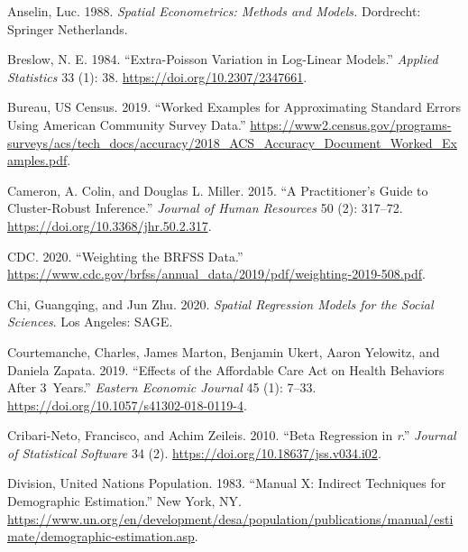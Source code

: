 \documentclass[
  letterpaper,
  DIV=11,
  numbers=noendperiod]{scrreprt}
\newlength{\cslhangindent}
\newlength{\cslentryspacingunit} %
\newenvironment{CSLReferences}[2] %
 {%
  \setlength{\parindent}{0pt}
  \ifodd #1
  \let\oldpar\par
  \def\par{\hangindent=\cslhangindent\oldpar}
  \fi
  \setlength{\parskip}{#2\cslentryspacingunit}
 }%
 {}
\begin{document}
\hypertarget{refs}{}
\begin{CSLReferences}{1}{0}
\leavevmode{}%
Anselin, Luc. 1988. \emph{Spatial {Econometrics}: {Methods} and
{Models}.} Dordrecht: Springer Netherlands.

\leavevmode{}%
Breslow, N. E. 1984. {``Extra-{Poisson} {Variation} in {Log}-{Linear}
{Models}.''} \emph{Applied Statistics} 33 (1): 38.
\url{https://doi.org/10.2307/2347661}.

\leavevmode{}%
Bureau, US Census. 2019. {``Worked {Examples} for {Approximating}
{Standard} {Errors} {Using} {American} {Community} {Survey} {Data}.''}
\url{https://www2.census.gov/programs-surveys/acs/tech_docs/accuracy/2018_ACS_Accuracy_Document_Worked_Examples.pdf}.

\leavevmode{}%
Cameron, A. Colin, and Douglas L. Miller. 2015. {``A {Practitioner}'s
{Guide} to {Cluster}-{Robust} {Inference}.''} \emph{Journal of Human
Resources} 50 (2): 317--72. \url{https://doi.org/10.3368/jhr.50.2.317}.

\leavevmode{}%
CDC. 2020. {``Weighting the BRFSS Data.''}
\url{https://www.cdc.gov/brfss/annual_data/2019/pdf/weighting-2019-508.pdf}.

\leavevmode{}%
Chi, Guangqing, and Jun Zhu. 2020. \emph{Spatial Regression Models for
the Social Sciences}. Los Angeles: SAGE.

\leavevmode{}%
Courtemanche, Charles, James Marton, Benjamin Ukert, Aaron Yelowitz, and
Daniela Zapata. 2019. {``Effects of the Affordable Care Act on Health
Behaviors After 3~Years.''} \emph{Eastern Economic Journal} 45 (1):
7--33. \url{https://doi.org/10.1057/s41302-018-0119-4}.

\leavevmode{}%
Cribari-Neto, Francisco, and Achim Zeileis. 2010. {``Beta {Regression}
in \emph{r}.''} \emph{Journal of Statistical Software} 34 (2).
\url{https://doi.org/10.18637/jss.v034.i02}.

\leavevmode{}%
Division, United Nations Population. 1983. {``Manual {X}: {Indirect}
{Techniques} for {Demographic} {Estimation}.''} New York, NY.
\url{https://www.un.org/en/development/desa/population/publications/manual/estimate/demographic-estimation.asp}.


\end{CSLReferences}
\end{document}
